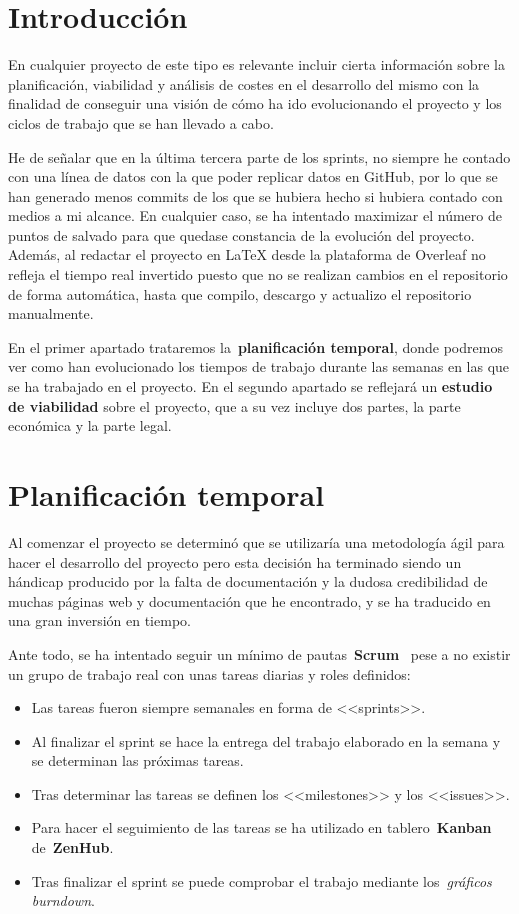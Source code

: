 
\section{Introducción}
En cualquier proyecto de este tipo es relevante incluir cierta información sobre la planificación, viabilidad y análisis de costes en el desarrollo del mismo con la finalidad de conseguir una visión de cómo ha ido evolucionando el proyecto y los ciclos de trabajo que se han llevado a cabo.

He de señalar que en la última tercera parte de los sprints, no siempre he contado con una línea de datos con la que poder replicar datos en GitHub, por lo que se han generado menos commits de los que se hubiera hecho si hubiera contado con medios a mi alcance. En cualquier caso, se ha intentado maximizar el número de puntos de salvado para que quedase constancia de la evolución del proyecto. Además, al redactar el proyecto en \LaTeX{} desde la plataforma de Overleaf no refleja el tiempo real invertido puesto que no se realizan cambios en el repositorio de forma automática, hasta que compilo, descargo y actualizo el repositorio manualmente.

En el primer apartado trataremos la~\textbf{planificación temporal}, donde podremos ver como han evolucionado los tiempos de trabajo durante las semanas en las que se ha trabajado en el proyecto. En el segundo apartado se reflejará un \textbf{estudio de viabilidad} sobre el proyecto, que a su vez incluye dos partes, la parte económica y la parte legal.

\section{Planificación temporal}
Al comenzar el proyecto se determinó que se utilizaría una metodología ágil para hacer el desarrollo del proyecto pero esta decisión ha terminado siendo un hándicap producido por la falta de documentación y la dudosa credibilidad de muchas páginas web y documentación que he encontrado, y se ha traducido en una gran inversión en tiempo.

Ante todo, se ha intentado seguir un mínimo de pautas~\textbf{Scrum}~\cite{manual:Scrum} pese a no existir un grupo de trabajo real con unas tareas diarias y roles definidos:
\begin{itemize}
    \item Las tareas fueron siempre semanales en forma de <<sprints>>.
    \item Al finalizar el sprint se hace la entrega del trabajo elaborado en la semana y se determinan las próximas tareas.
    \item Tras determinar las tareas se definen los <<milestones>> y los <<issues>>.
    \item Para hacer el seguimiento de las tareas se ha utilizado en tablero~\textbf{Kanban} de~\textbf{ZenHub}.
    \item Tras finalizar el sprint se puede comprobar el trabajo mediante los~\textit{gráficos burndown}.
\end{itemize}

